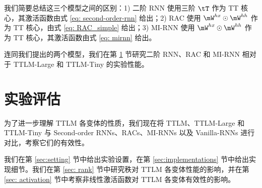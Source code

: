 \documentclass{article}
\theoremstyle{plain}
\theoremstyle{definition}
\theoremstyle{remark}
\begin{document}
我们简要总结这三个模型之间的区别：1) 二阶 RNN 使用三阶 $\tT$ 作为 TT 核心，其激活函数由式 \ref{eq: second-order-rnn} 给出；2)
RAC 使用 $\mW^{hx} \odot \mW^{hh}$ 作为 TT 核心，由式 \ref{eq: RAC_simple} 给出；3) MI-RNN 使用 $\mW^{hx} \odot \mW^{hh}$ 作为 TT 核心，其激活函数由式 \ref{eq: mirnn} 给出。

连同我们提出的两个模型，我们在第 \ref{sec: experiments} 节研究二阶 RNN、RAC 和 MI-RNN 相对于 TTLM-Large 和 TTLM-Tiny 的实验性能。
\section{实验评估}
\label{sec: experiments}

为了进一步理解 TTLM 各变体的性质，我们现在将 TTLM、TTLM-Large 和 TTLM-Tiny 与 Second-order RNNs、RACs、MI-RNNs 以及 Vanilla-RNNs 进行对比，考察它们的有效性。


我们在第 \ref{sec:setting} 节中给出实验设置，在第 \ref{sec:implementations} 节中给出实现细节。我们在第 \ref{sec: rank} 节中研究秩对 TTLM 各变体性能的影响，并在第 \ref{sec: activation} 节中考察非线性激活函数对 TTLM 各变体有效性的影响。
\end{document}
